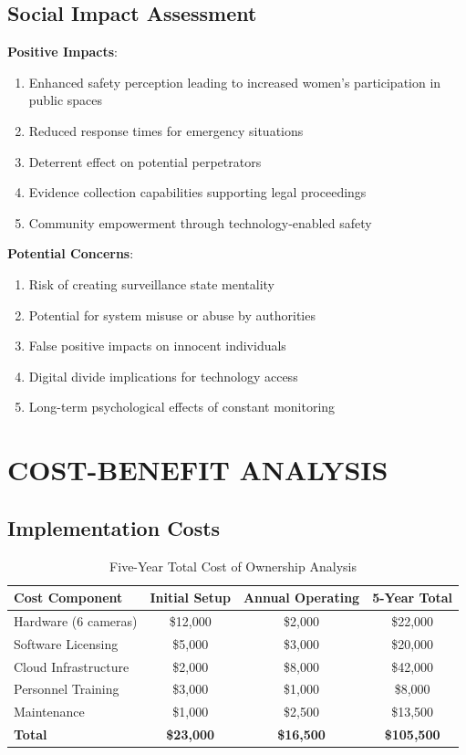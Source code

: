\documentclass[12pt,a4paper]{article}
\begin{document}
\subsection{Social Impact Assessment}

\textbf{Positive Impacts}:
\begin{enumerate}
    \item Enhanced safety perception leading to increased women's participation in public spaces
    \item Reduced response times for emergency situations
    \item Deterrent effect on potential perpetrators
    \item Evidence collection capabilities supporting legal proceedings
    \item Community empowerment through technology-enabled safety
\end{enumerate}

\textbf{Potential Concerns}:
\begin{enumerate}
    \item Risk of creating surveillance state mentality
    \item Potential for system misuse or abuse by authorities
    \item False positive impacts on innocent individuals
    \item Digital divide implications for technology access
    \item Long-term psychological effects of constant monitoring
\end{enumerate}

\newpage
\section{COST-BENEFIT ANALYSIS}

\subsection{Implementation Costs}

\begin{table}[h]
\centering
\begin{tabular}{|l|c|c|c|}
\hline
\textbf{Cost Component} & \textbf{Initial Setup} & \textbf{Annual Operating} & \textbf{5-Year Total} \\
\hline
Hardware (6 cameras) & \$12,000 & \$2,000 & \$22,000 \\
\hline
Software Licensing & \$5,000 & \$3,000 & \$20,000 \\
\hline
Cloud Infrastructure & \$2,000 & \$8,000 & \$42,000 \\
\hline
Personnel Training & \$3,000 & \$1,000 & \$8,000 \\
\hline
Maintenance & \$1,000 & \$2,500 & \$13,500 \\
\hline
\textbf{Total} & \textbf{\$23,000} & \textbf{\$16,500} & \textbf{\$105,500} \\
\hline
\end{tabular}
\caption{Five-Year Total Cost of Ownership Analysis}
\end{table}
\end{document}
